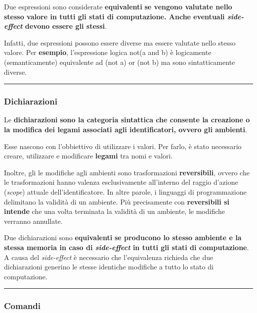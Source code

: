 \documentclass[a4paper]{article}
\newcommand{\longline}{\noindent\rule{\textwidth}{0.4pt}}
\begin{document}
	\noindent
	Due espressioni sono considerate \textcolor{Red3}{\textbf{equivalenti}} \textbf{se vengono valutate nello stesso valore in tutti gli stati di computazione. Anche eventuali \emph{side-effect} devono essere gli stessi}.
	
	Infatti, due espressioni possono essere diverse ma essere valutate nello stesso valore. Per \textcolor{Green4}{\textbf{esempio}}, l'espressione logica \textsf{not(a and b)} è logicamente (semanticamente) equivalente ad \textsf{(not a) or (not b)} ma sono sintatticamente diverse.
	
	\longline
	
	\subsubsection{Dichiarazioni}
	
	Le \textcolor{Red3}{\textbf{dichiarazioni}} \textbf{sono la categoria sintattica che consente la creazione o la modifica dei legami associati agli identificatori, ovvero gli ambienti}.\newline
	
	\noindent
	Esse nascono con l'obbiettivo di utilizzare i valori. Per farlo, è stato necessario creare, utilizzare e modificare \textbf{legami} tra nomi e valori.
	
	Inoltre, gli le modifiche agli ambienti sono trasformazioni \textbf{reversibili}, ovvero che le trasformazioni hanno valenza esclusivamente all'interno del raggio d'azione (\emph{scope}) attuale dell'identificatore. In altre parole, i linguaggi di programmazione delimitano la validità di un ambiente. Più precisamente con \textbf{reversibili si intende} che una volta terminata la validità di un ambiente, le modifiche verranno annullate.\newline
	
	\noindent
	Due dichiarazioni sono \textcolor{Red3}{\textbf{equivalenti}} \textbf{se producono lo stesso ambiente e la stessa memoria in caso di \emph{side-effect} in tutti gli stati di computazione}.\newline
	A causa del \emph{side-effect} è necessario che l'equivalenza richieda che due dichiarazioni generino le stesse identiche modifiche a tutto lo stato di computazione.
	
	\longline
	
	\subsubsection{Comandi}
	
\end{document}
